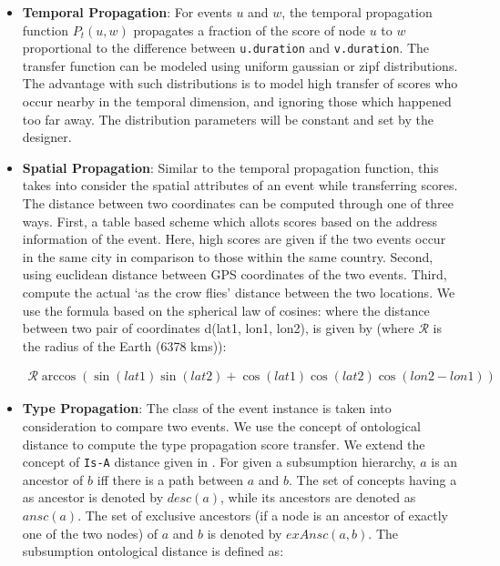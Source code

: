 \begin{itemize}
\item \textbf{Temporal Propagation}: For events $u$ and $w$, the temporal propagation function $P_t (u, w)$ propagates a fraction of the score of node $u$ to $w$ proportional to the difference between \texttt{u.duration} and \texttt{v.duration}. The transfer function can be modeled using uniform gaussian or zipf distributions. The advantage with such distributions is to model high transfer of scores who occur nearby in the temporal dimension, and ignoring those which happened too far away. The distribution parameters will be constant and set by the designer.

\item \textbf{Spatial Propagation}: Similar to the temporal propagation function, this takes into consider the spatial attributes of an event while transferring scores. The distance between two coordinates can be computed through one of three ways. First, a table based scheme which allots scores based on the address information of the event. Here, high scores are given if the two events occur in the same city in comparison to those within the same country. Second, using euclidean distance between GPS coordinates of the two events. Third, compute the actual `as the crow flies' distance between the two locations. We use the formula based on the spherical law of cosines: where the distance between two pair of coordinates d(lat1, lon1, lon2), is given by (where $\mathcal R$ is the radius of the Earth (6378 kms)):


\begin{align}
\label{eq:distance}
\mathcal R \arccos(\sin(lat1) \sin(lat2) + \cos(lat1) \cos(lat2) \cos(lon2 - lon1))
\end{align}


\item \textbf{Type Propagation}: The class of the event instance is taken into consideration to compare two events. We use the concept of ontological distance to compute the type propagation score transfer. We extend the concept of \texttt{Is-A} distance given in \cite{ranwez2006ontological}. For given a subsumption hierarchy, $a$ is an ancestor of $b$ iff there is a path between $a$ and $b$. The set of concepts having a as ancestor is denoted by $desc(a)$, while its ancestors are denoted as $ansc(a)$. The set of exclusive ancestors (if a node is an ancestor of exactly one of the two nodes) of $a$ and $b$ is denoted by $exAnsc(a, b)$. The subsumption ontological distance is defined as:


\end{itemize}
